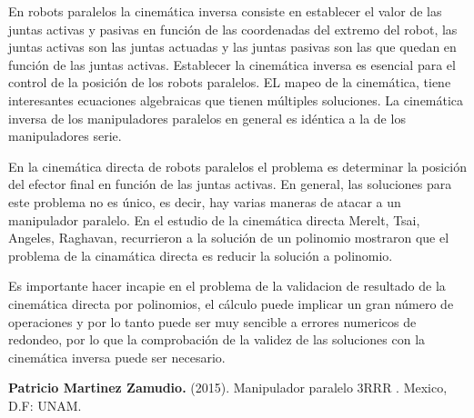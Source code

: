 \documentclass[letter,openrigh,12pt,spanish]{report}
\begin{document}
En robots paralelos la cinem\'atica inversa consiste en establecer el valor de las juntas activas y pasivas en funci\'on de las coordenadas del extremo del robot, las juntas activas son las juntas actuadas y las juntas pasivas son las que quedan en funci\'on de las juntas activas. Establecer la cinem\'atica inversa es esencial para el control de la posici\'on de los robots paralelos. EL mapeo de la cinem\'atica, tiene interesantes ecuaciones algebraicas que tienen m\'ultiples soluciones. La cinem\'atica inversa de los manipuladores paralelos en general es id\'entica a la de los manipuladores serie.

En la cinem\'atica directa de robots paralelos el problema es determinar la posici\'on del efector final en funci\'on de las juntas activas. En general, las soluciones para este problema no es \'unico, es decir, hay varias maneras de atacar a un manipulador paralelo. En el estudio de la cinem\'atica directa Merelt, Tsai, Angeles, Raghavan, recurrieron a la soluci\'on de un polinomio mostraron que el problema de la cinam\'atica directa es reducir la soluci\'on a polinomio.

Es importante hacer incapie en el problema de la validacion de resultado de la cinem\'atica directa por polinomios, el c\'alculo puede implicar un gran n\'umero de operaciones y por lo tanto puede ser muy sencible a errores numericos de redondeo, por lo que la comprobaci\'on de la validez de las soluciones con la cinem\'atica inversa puede ser necesario.

\begin{thebibliography}{X}
 \textbf{Patricio Martinez Zamudio.} (2015). Manipulador paralelo 3RRR . Mexico, D.F: UNAM.
\end{thebibliography}
\end{document}
